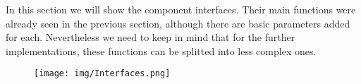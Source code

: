 	In this section we will show the component interfaces. Their main functions were already seen in the previous section, although there are basic parameters added for each. Nevertheless we need to keep in mind that for the further implementations, these functions can be splitted into less complex ones.  
		\newpage
		\begin{figure}[h]
			\texttt{[image: img/Interfaces.png]}
		\end{figure}
